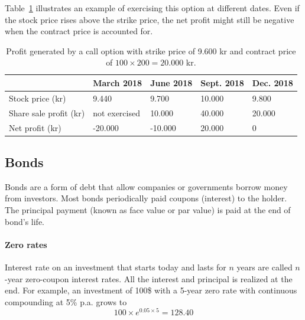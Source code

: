 Table~\ref{table:option-sell} illustrates an example of exercising this option at different dates. Even if the stock price rises above the strike price, the net profit might still be negative when the contract price is accounted for.  

\begin{table}[h]
\centering
\caption{Profit generated by a call option with strike price of 9.600 kr and contract price of $100 \times 200 = 20.000$ kr.}
\label{table:option-sell}
\begin{tabular}{|l|l|l|l|l|}
\hline
                       & March 2018    & June 2018 & Sept. 2018 & Dec. 2018 \\ \hline
Stock price (kr)       & 9.440         & 9.700     & 10.000         & 9.800         \\ \hline
Share sale profit (kr) & not exercised & 10.000    & 40.000         & 20.000        \\ \hline
Net profit (kr)        & -20.000       & -10.000   & 20.000         & 0             \\ \hline
\end{tabular}
\end{table}

\subsection{Bonds}
Bonds are a form of debt that allow companies or governments borrow money from investors. Most bonds periodically paid coupons (interest) to the holder. The principal payment (known as face value or par value) is paid at the end of bond's life.~\cite[pg.80]{ofod}

\paragraph{Zero rates}
Interest rate on an investment that starts today and lasts for $n$ years are called $n$-year zero-coupon interest rates. All the interest and principal is realized at the end. For example, an investment of 100\$ with a 5-year zero rate with continuous compounding at 5\% p.a. grows to~\cite[pg.80]{ofod}
\begin{equation*}
    100 \times e^{0.05 \times 5} = 128.40
\end{equation*}


